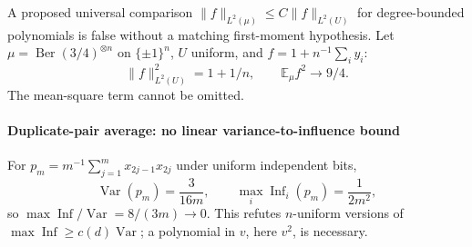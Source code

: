 A proposed universal comparison \(\|f\|_{L^2(\mu)}\le C\|f\|_{L^2(U)}\) for degree-bounded polynomials is false without a matching first-moment hypothesis. Let \(\mu=\operatorname{Ber}(3/4)^{\otimes n}\) on \(\{\pm1\}^n\), \(U\) uniform, and \(f=1+n^{-1}\sum_i y_i\):
\[\|f\|_{L^2(U)}^2=1+1/n,\qquad
\mathbb E_\mu f^2\to9/4.\]
The mean-square term cannot be omitted.

\paragraph{Duplicate-pair average: no linear variance-to-influence bound}\label{duplicate-pair-average-no-linear-variance-to-influence-bound}

For \(p_m=m^{-1}\sum_{j=1}^m x_{2j-1}x_{2j}\) under uniform independent bits,
\[\operatorname{Var}(p_m)=\frac3{16m},\qquad
\max_i\operatorname{Inf}_i(p_m)=\frac1{2m^2},\]
so \(\max\operatorname{Inf}/\operatorname{Var}=8/(3m)\to0\). This refutes \(n\)-uniform versions of \(\max\operatorname{Inf}\ge c(d)\operatorname{Var}\); a polynomial in \(v\), here \(v^2\), is necessary.
